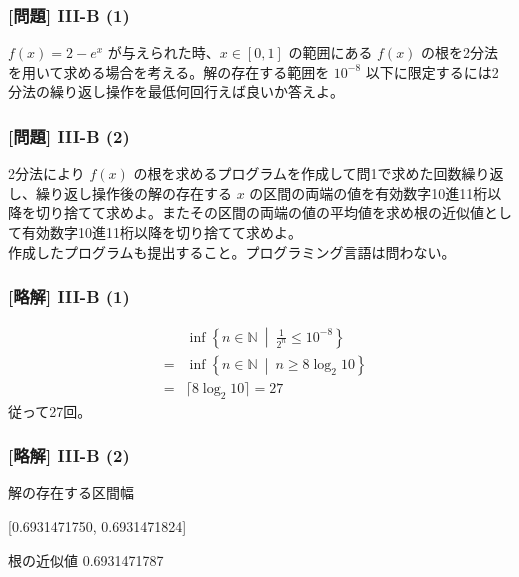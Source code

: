\documentclass[dvipdfmx,aspectratio=169,20pt]{beamer}
\newcommand{\myfontsetting}[3]{{\fontsize{#1}{#2}\selectfont #3}}
\begin{document}
\begin{frame}
\frametitle{[問題] I\hspace{-.1em}I\hspace{-.1em}I-B (1)}
\myfontsetting{18pt}{20pt}{
$f(x)=2-e^{x}$ が与えられた時、$x\in [0,1]$ の範囲にある $f(x)$ の根を2分法を用いて求める場合を考える。解の存在する範囲を $10^{-8}$ 以下に限定するには2分法の繰り返し操作を最低何回行えば良いか答えよ。%
}
\end{frame}
\begin{frame}
\frametitle{[問題] I\hspace{-.1em}I\hspace{-.1em}I-B (2)}
\myfontsetting{18pt}{20pt}{
2分法により $f(x)$ の根を求めるプログラムを作成して問1で求めた回数繰り返し、繰り返し操作後の解の存在する $x$ の区間の両端の値を有効数字10進11桁以降を切り捨てて求めよ。またその区間の両端の値の平均値を求め根の近似値として有効数字10進11桁以降を切り捨てて求めよ。
}\\
\myfontsetting{12pt}{14pt}{
作成したプログラムも提出すること。プログラミング言語は問わない。
}
\end{frame}
\begin{frame}
\frametitle{[略解] I\hspace{-.1em}I\hspace{-.1em}I-B (1)}
\vspace{-0.5cm}
\begin{eqnarray*}
    &&\inf \left\{n\in \mathbb{N}\  \middle| \ \frac{1}{2^n}\le 10^{-8} \right\}\\
    &=& \inf \left\{n\in \mathbb{N}\  \middle| \ n \ge 8\log_2 10 \right\}\\
    &=& \lceil 8\log_2 10 \rceil= 27
\end{eqnarray*}
従って27回。
\end{frame}
\begin{frame}
\frametitle{[略解] I\hspace{-.1em}I\hspace{-.1em}I-B (2)}
\vspace{-0.5cm}
解の存在する区間幅

[0.6931471750, 0.6931471824]

\vspace{0.5cm}
根の近似値 0.6931471787

\end{frame}
\end{document}
